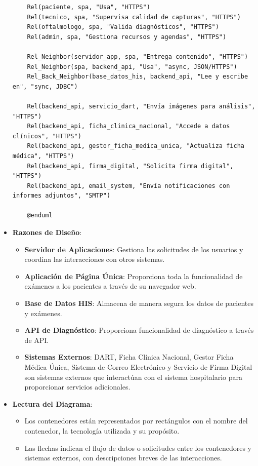 \begin{itemize}
\begin{verbatim}
    Rel(paciente, spa, "Usa", "HTTPS")
    Rel(tecnico, spa, "Supervisa calidad de capturas", "HTTPS")
    Rel(oftalmologo, spa, "Valida diagnósticos", "HTTPS")
    Rel(admin, spa, "Gestiona recursos y agendas", "HTTPS")

    Rel_Neighbor(servidor_app, spa, "Entrega contenido", "HTTPS")
    Rel_Neighbor(spa, backend_api, "Usa", "async, JSON/HTTPS")
    Rel_Back_Neighbor(base_datos_his, backend_api, "Lee y escribe en", "sync, JDBC")

    Rel(backend_api, servicio_dart, "Envía imágenes para análisis", "HTTPS")
    Rel(backend_api, ficha_clinica_nacional, "Accede a datos clínicos", "HTTPS")
    Rel(backend_api, gestor_ficha_medica_unica, "Actualiza ficha médica", "HTTPS")
    Rel(backend_api, firma_digital, "Solicita firma digital", "HTTPS")
    Rel(backend_api, email_system, "Envía notificaciones con informes adjuntos", "SMTP")

    @enduml
    \end{verbatim}
    \item \textbf{Razones de Diseño}:
    \begin{itemize}
        \item \textbf{Servidor de Aplicaciones}: Gestiona las solicitudes de los usuarios y coordina las interacciones con otros sistemas.
        \item \textbf{Aplicación de Página Única}: Proporciona toda la funcionalidad de exámenes a los pacientes a través de su navegador web.
        \item \textbf{Base de Datos HIS}: Almacena de manera segura los datos de pacientes y exámenes.
        \item \textbf{API de Diagnóstico}: Proporciona funcionalidad de diagnóstico a través de API.
        \item \textbf{Sistemas Externos}: DART, Ficha Clínica Nacional, Gestor Ficha Médica Única, Sistema de Correo Electrónico y Servicio de Firma Digital son sistemas externos que interactúan con el sistema hospitalario para proporcionar servicios adicionales.
    \end{itemize}
    \item \textbf{Lectura del Diagrama}:
    \begin{itemize}
        \item Los contenedores están representados por rectángulos con el nombre del contenedor, la tecnología utilizada y su propósito.
        \item Las flechas indican el flujo de datos o solicitudes entre los contenedores y sistemas externos, con descripciones breves de las interacciones.
    \end{itemize}
\end{itemize}


